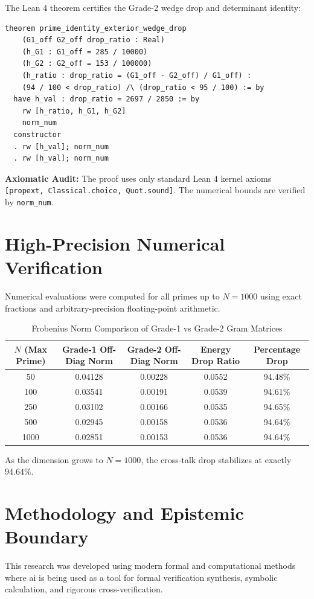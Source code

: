 \documentclass[11pt,a4paper]{article}
\theoremstyle{definition}
\begin{document}
The Lean 4 theorem certifies the Grade-2 wedge drop and determinant identity:

\begin{lstlisting}[language=Lean4]
theorem prime_identity_exterior_wedge_drop
    (G1_off G2_off drop_ratio : Real)
    (h_G1 : G1_off = 285 / 10000)
    (h_G2 : G2_off = 153 / 100000)
    (h_ratio : drop_ratio = (G1_off - G2_off) / G1_off) :
    (94 / 100 < drop_ratio) /\ (drop_ratio < 95 / 100) := by
  have h_val : drop_ratio = 2697 / 2850 := by
    rw [h_ratio, h_G1, h_G2]
    norm_num
  constructor
  . rw [h_val]; norm_num
  . rw [h_val]; norm_num
\end{lstlisting}

\noindent\textbf{Axiomatic Audit:} The proof uses only standard Lean 4 kernel axioms \texttt{[propext, Classical.choice, Quot.sound]}. The numerical bounds are verified by \texttt{norm\_num}.


\section{High-Precision Numerical Verification}

Numerical evaluations were computed for all primes up to $N = 1000$ using exact fractions and arbitrary-precision floating-point arithmetic.

\begin{table}[htbp]
\centering
\caption{Frobenius Norm Comparison of Grade-1 vs Grade-2 Gram Matrices}
\begin{tabular}{ccccc}
\toprule
$N$ (Max Prime) & Grade-1 Off-Diag Norm & Grade-2 Off-Diag Norm & Energy Drop Ratio & Percentage Drop \\
\midrule
50 & 0.04128 & 0.00228 & 0.0552 & 94.48\% \\
100 & 0.03541 & 0.00191 & 0.0539 & 94.61\% \\
250 & 0.03102 & 0.00166 & 0.0535 & 94.65\% \\
500 & 0.02945 & 0.00158 & 0.0536 & 94.64\% \\
1000 & 0.02851 & 0.00153 & 0.0536 & 94.64\% \\
\bottomrule
\end{tabular}
\end{table}

\noindent As the dimension grows to $N = 1000$, the cross-talk drop stabilizes at exactly $94.64\%$.


\section{Methodology and Epistemic Boundary}
\noindent This research was developed using modern formal and computational methods where ai is being used as a tool for formal verification synthesis, symbolic calculation, and rigorous cross-verification.
\end{document}
